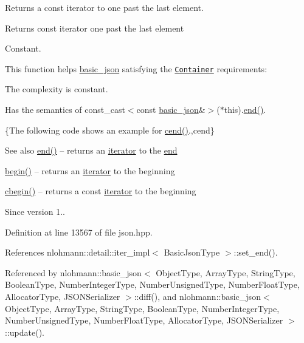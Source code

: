 Returns a const iterator to one past the last element.

 \begin{DoxyReturn}{Returns}
const iterator one past the last element
\end{DoxyReturn}
Constant.

This function helps {\ttfamily \hyperlink{classnlohmann_1_1basic__json}{basic\+\_\+json}} satisfying the \href{http://en.cppreference.com/w/cpp/concept/Container}{\tt Container} requirements\+:
\begin{DoxyItemize}
\item The complexity is constant.
\item Has the semantics of {\ttfamily const\+\_\+cast$<$const \hyperlink{classnlohmann_1_1basic__json}{basic\+\_\+json}\&$>$($\ast$this).\hyperlink{classnlohmann_1_1basic__json_a13e032a02a7fd8a93fdddc2fcbc4763c}{end()}}.
\end{DoxyItemize}

\{The following code shows an example for {\ttfamily \hyperlink{classnlohmann_1_1basic__json_a8dba7b7d2f38e6b0c614030aa43983f6}{cend()}}.,cend\}

\begin{DoxySeeAlso}{See also}
\hyperlink{classnlohmann_1_1basic__json_a13e032a02a7fd8a93fdddc2fcbc4763c}{end()} -- returns an \hyperlink{classnlohmann_1_1basic__json_a099316232c76c034030a38faa6e34dca}{iterator} to the \hyperlink{classnlohmann_1_1basic__json_a13e032a02a7fd8a93fdddc2fcbc4763c}{end} 

\hyperlink{classnlohmann_1_1basic__json_a0ff28dac23f2bdecee9564d07f51dcdc}{begin()} -- returns an \hyperlink{classnlohmann_1_1basic__json_a099316232c76c034030a38faa6e34dca}{iterator} to the beginning 

\hyperlink{classnlohmann_1_1basic__json_ad865d6c291b237ae508d5cb2146b5877}{cbegin()} -- returns a const \hyperlink{classnlohmann_1_1basic__json_a099316232c76c034030a38faa6e34dca}{iterator} to the beginning
\end{DoxySeeAlso}
\begin{DoxySince}{Since}
version 1.. 
\end{DoxySince}


Definition at line 13567 of file json.\+hpp.



References nlohmann\+::detail\+::iter\+\_\+impl$<$ Basic\+Json\+Type $>$\+::set\+\_\+end().



Referenced by nlohmann\+::basic\+\_\+json$<$ Object\+Type, Array\+Type, String\+Type, Boolean\+Type, Number\+Integer\+Type, Number\+Unsigned\+Type, Number\+Float\+Type, Allocator\+Type, J\+S\+O\+N\+Serializer $>$\+::diff(), and nlohmann\+::basic\+\_\+json$<$ Object\+Type, Array\+Type, String\+Type, Boolean\+Type, Number\+Integer\+Type, Number\+Unsigned\+Type, Number\+Float\+Type, Allocator\+Type, J\+S\+O\+N\+Serializer $>$\+::update().


